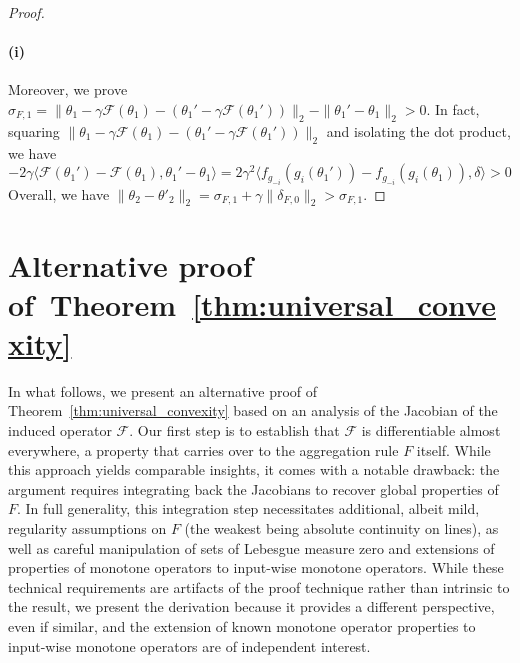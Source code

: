 \documentclass[twoside,11pt]{article}
\newcommand{\F}{\mathcal{F}}
\begin{document}
\begin{proof}
    \paragraph{(i)}
    Moreover, we prove $\sigma_{F, 1} = \|\theta_1 - \gamma \F(\theta_1) - (\theta_1' - \gamma \F(\theta_1'))\|_2 - \|\theta_1' - \theta_1\|_2 > 0$.
    In fact, squaring $\|\theta_1 - \gamma \F(\theta_1) - (\theta_1' - \gamma \F(\theta_1'))\|_2$ and isolating the dot product, we have
    \begin{equation*}
        - 2\gamma \langle \mathcal{F}(\theta_1') - \mathcal{F}(\theta_1), \theta_1' - \theta_1 \rangle
        = 2 \gamma^2 \langle f_{g_{-i}}(g_i(\theta_1')) - f_{g_{-i}}(g_i(\theta_1)),  \delta \rangle 
        > 0
    \end{equation*}
    Overall, we have
    $
        \|\theta_{2} - \theta'_{2}\|_2
        = \sigma_{F,1} + \gamma \|\delta_{F,0}\|_2
        > \sigma_{F,1}.
    $
\end{proof}

\section{\texorpdfstring{Alternative proof of~Theorem~\ref{thm:universal_convexity}}{}}\label{sec:alternative-monotonone}

In what follows, we present an alternative proof of Theorem~\ref{thm:universal_convexity} based on an analysis of the Jacobian of the induced operator $\F$. 
Our first step is to establish that $\F$ is differentiable almost everywhere, a property that carries over to the aggregation rule $F$ itself. 
While this approach yields comparable insights, it comes with a notable drawback: the argument requires integrating back the Jacobians to recover global properties of $F$. 
In full generality, this integration step necessitates additional, albeit mild, regularity assumptions on $F$ (the weakest being absolute continuity on lines), as well as careful manipulation of sets of Lebesgue measure zero and extensions of properties of monotone operators to input-wise monotone operators.
While these technical requirements are artifacts of the proof technique rather than intrinsic to the result, we present the derivation because it provides a different perspective, even if similar, and the extension of known monotone operator properties to input-wise monotone operators are of independent interest.
\end{document}
